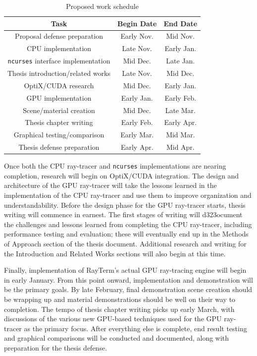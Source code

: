 \documentclass[11pt]{article}
\newcommand{\name}{{\sc RayTerm}}
\begin{document}
\begin{table}[htb]
  \vspace*{0.6em}
  \centering
  \begin{tabular}{|c||c|c|}
    \hline
    \textbf{Task} & \textbf{Begin Date} & \textbf{End Date} \\\hline\hline
    Proposal defense preparation & Early Nov. & Mid Nov. \\\hline
    CPU implementation & Late Nov. & Early Jan. \\\hline
    \texttt{ncurses} interface implementation & Mid Dec. & Late Jan. \\\hline
    Thesis introduction/related works & Late Nov. & Mid Dec. \\\hline
    OptiX/CUDA research & Mid Dec. & Early Jan. \\\hline
    GPU implementation & Early Jan. & Early Feb. \\\hline
    Scene/material creation & Mid Dec. & Late Mar. \\\hline
    Thesis chapter writing & Early Feb. & Early Apr. \\\hline
    Graphical testing/comparison & Early Mar. & Mid Mar. \\\hline
    Thesis defense preparation & Early Apr. & Mid Apr. \\\hline
  \end{tabular}
  \caption{Proposed work schedule}
  \label{worktable}
\end{table}

Once both the CPU ray-tracer and \texttt{ncurses} implementations are nearing completion, research will begin on OptiX/CUDA integration.
The design and architecture of the GPU ray-tracer will take the lessons learned in the implementation of the CPU ray-tracer and use them to improve organization and understandability.
Before the design phase for the GPU ray-tracer starts, thesis writing will commence in earnest.
The first stages of writing will d323ocument the challenges and lessons learned from completing the CPU ray-tracer, including performance testing and evaluation; these will eventually end up in the Methods of Approach section of the thesis document.
Additional research and writing for the Introduction and Related Works sections will also begin at this time.

Finally, implementation of \name's actual GPU ray-tracing engine will begin in early January.
From this point onward, implementation and demonstration will be the primary goals.
By late February, final demonstration scene creation should be wrapping up and material demonstrations should be well on their way to completion.
The tempo of thesis chapter writing picks up early March, with discussions of the various new GPU-based techniques used for the GPU ray-tracer as the primary focus.
After everything else is complete, end result testing and graphical comparisons will be conducted and documented, along with preparation for the thesis defense.
\end{document}
